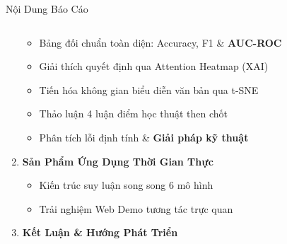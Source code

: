 \documentclass[aspectratio=169, 10pt]{beamer}
\begin{document}
\begin{frame}{Nội Dung Báo Cáo}
\begin{columns}[T, onlytextwidth]
\begin{column}{0.48\textwidth}
\begin{enumerate}
\begin{itemize}
          \item Bảng đối chuẩn toàn diện: Accuracy, F1 \& \textbf{AUC-ROC}
          \item Giải thích quyết định qua Attention Heatmap (XAI)
          \item Tiến hóa không gian biểu diễn văn bản qua t-SNE
          \item Thảo luận 4 luận điểm học thuật then chốt
          \item Phân tích lỗi định tính \& \textbf{Giải pháp kỹ thuật}
        \end{itemize}
        \item \textbf{\color{HCMUEDarkBlue}Sản Phẩm Ứng Dụng Thời Gian Thực}
        \begin{itemize}\fontsize{8}{10}\selectfont\setlength{\itemsep}{0.15em}
          \item Kiến trúc suy luận song song 6 mô hình
          \item Trải nghiệm Web Demo tương tác trực quan
        \end{itemize}
        \item \textbf{\color{HCMUEDarkBlue}Kết Luận \& Hướng Phát Triển}
      \end{enumerate}
    \end{column}
  \end{columns}
\end{frame}
\end{document}
